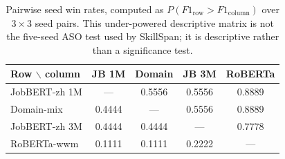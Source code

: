 \begin{table}[htbp]
\caption{Pairwise seed win rates, computed as $P(F1_{\mathrm{row}}>F1_{\mathrm{column}})$ over $3\times3$ seed pairs. This under-powered descriptive matrix is not the five-seed ASO test used by SkillSpan; it is descriptive rather than a significance test.}
\label{tab:seed-win}
\centering
\scriptsize
\begin{tabular}{lcccc}
\toprule
\textbf{Row $\backslash$ column} & \textbf{JB 1M} & \textbf{Domain} & \textbf{JB 3M} & \textbf{RoBERTa} \\
\midrule
JobBERT-zh 1M & --- & 0.5556 & 0.5556 & 0.8889 \\
Domain-mix & 0.4444 & --- & 0.5556 & 0.8889 \\
JobBERT-zh 3M & 0.4444 & 0.4444 & --- & 0.7778 \\
RoBERTa-wwm & 0.1111 & 0.1111 & 0.2222 & --- \\
\bottomrule
\end{tabular}
\end{table}
